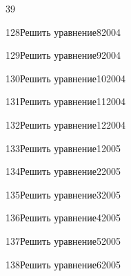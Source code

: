 \begin{TrigSourcePage}{39}
\begin{TrigExercise}{128}{Решить уравнение}{8}{2004}
\end{TrigExercise}
\begin{TrigExercise}{129}{Решить уравнение}{9}{2004}
\end{TrigExercise}
\begin{TrigExercise}{130}{Решить уравнение}{10}{2004}
\end{TrigExercise}
\begin{TrigExercise}{131}{Решить уравнение}{11}{2004}
\end{TrigExercise}
\begin{TrigExercise}{132}{Решить уравнение}{12}{2004}
\end{TrigExercise}
\begin{TrigExercise}{133}{Решить уравнение}{1}{2005}
\end{TrigExercise}
\begin{TrigExercise}{134}{Решить уравнение}{2}{2005}
\end{TrigExercise}
\begin{TrigExercise}{135}{Решить уравнение}{3}{2005}
\end{TrigExercise}
\begin{TrigExercise}{136}{Решить уравнение}{4}{2005}
\end{TrigExercise}
\begin{TrigExercise}{137}{Решить уравнение}{5}{2005}
\end{TrigExercise}
\begin{TrigExercise}{138}{Решить уравнение}{6}{2005}

\end{TrigExercise}
\end{TrigSourcePage}
